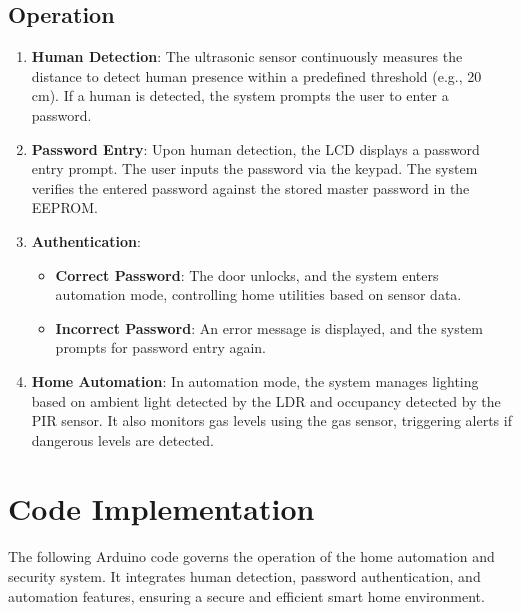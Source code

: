 \documentclass[a4paper,12pt]{article}
\begin{document}
\subsection{Operation}
\begin{enumerate}
    \item \textbf{Human Detection}: The ultrasonic sensor continuously measures the distance to detect human presence within a predefined threshold (e.g., 20 cm). If a human is detected, the system prompts the user to enter a password.
    
    \item \textbf{Password Entry}: Upon human detection, the LCD displays a password entry prompt. The user inputs the password via the keypad. The system verifies the entered password against the stored master password in the EEPROM.
    
    \item \textbf{Authentication}:
    \begin{itemize}
        \item \textbf{Correct Password}: The door unlocks, and the system enters automation mode, controlling home utilities based on sensor data.
        \item \textbf{Incorrect Password}: An error message is displayed, and the system prompts for password entry again.
    \end{itemize}
   
    \item \textbf{Home Automation}: In automation mode, the system manages lighting based on ambient light detected by the LDR and occupancy detected by the PIR sensor. It also monitors gas levels using the gas sensor, triggering alerts if dangerous levels are detected.
\end{enumerate}

\section{Code Implementation}
The following Arduino code governs the operation of the home automation and security system. It integrates human detection, password authentication, and automation features, ensuring a secure and efficient smart home environment.

\end{document}
